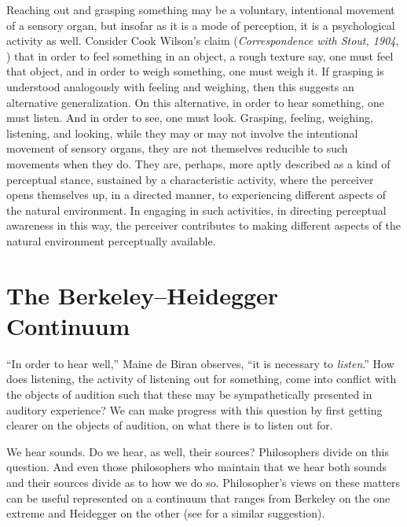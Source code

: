 Reaching out and grasping something may be a voluntary, intentional movement of a sensory organ, but insofar as it is a mode of perception, it is a psychological activity as well. Consider Cook Wilson's claim (\emph{Correspondence with Stout, 1904}, \citeyear{Cook-Wilson:1926sf}) that in order to feel something in an object, a rough texture say, one must feel that object, and in order to weigh something, one must weigh it. If grasping is understood analogously with feeling and weighing, then this suggests an alternative generalization. On this alternative, in order to hear something, one must listen. And in order to see, one must look. Grasping, feeling, weighing, listening, and looking, while they may or may not involve the intentional movement of sensory organs, they are not themselves reducible to such movements when they do. They are, perhaps, more aptly described as a kind of perceptual stance, sustained by a characteristic activity, where the perceiver opens themselves up, in a directed manner, to experiencing different aspects of the natural environment. In engaging in such activities, in directing perceptual awareness in this way, the perceiver contributes to making different aspects of the natural environment perceptually available.


\section{The Berkeley--Heidegger Continuum} %
\label{sec:the_berkeley_heidegger_continuum}

``In order to hear well,'' Maine de Biran observes, ``it is necessary to \emph{listen}.'' How does listening, the activity of listening out for something, come into conflict with the objects of audition such that these may be sympathetically presented in auditory experience? We can make progress with this question by first getting clearer on the objects of audition, on what there is to listen out for.

We hear sounds. Do we hear, as well, their sources? Philosophers divide on this question. And even those philosophers who maintain that we hear both sounds and their sources divide as to how we do so. Philosopher's views on these matters can be useful represented on a continuum that ranges from Berkeley on the one extreme and Heidegger on the other (see \citealt{Leddington:2014aa} for a similar suggestion). 

